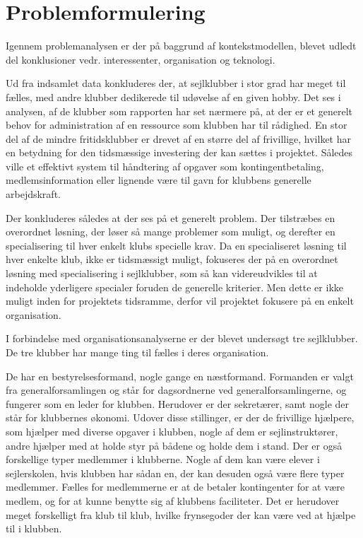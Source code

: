 \chapter{Problemformulering}\label{chap:problemformulering}


Igennem problemanalysen er der på baggrund af kontekstmodellen, blevet udledt del konklusioner vedr. interessenter, organisation og teknologi.

Ud fra indsamlet data konkluderes der, at sejlklubber i stor grad har meget til fælles, med andre klubber dedikerede til udøvelse af en given hobby. Det ses i analysen, af de klubber som rapporten har set nærmere på, at der er et generelt behov for administration af en ressource som klubben har til rådighed. En stor del af de mindre fritidsklubber er drevet af en større del af frivillige, hvilket har en betydning for den tidsmæssige investering der kan sættes i projektet. Således ville et effektivt system til håndtering af opgaver som kontingentbetaling, medlemsinformation eller lignende være til gavn for klubbens generelle arbejdskraft.

Der konkluderes således at der ses på et generelt problem. Der tilstræbes en overordnet løsning, der løser så mange problemer som muligt, og derefter en specialisering til hver enkelt klubs specielle krav. Da en specialiseret løsning til hver enkelte klub, ikke er tidsmæssigt muligt, fokuseres der på en overordnet løsning med specialisering i sejlklubber, som så kan videreudvikles til at indeholde yderligere specialer foruden de generelle kriterier. Men dette er ikke muligt inden for projektets tidsramme, derfor vil projektet fokusere på en enkelt organisation. 

I forbindelse med organisationsanalyserne er der blevet undersøgt tre sejlklubber. De tre klubber har mange ting til fælles i deres organisation.

De har en bestyrelsesformand, nogle gange en næstformand. Formanden er valgt fra generalforsamlingen og står for
dagsordnerne ved generalforsamlingerne, og fungerer som en leder for klubben. Herudover er der sekretærer, samt nogle
der står for klubbernes økonomi. Udover disse stillinger, er der de frivillige hjælpere, som hjælper med diverse opgaver
i klubben, nogle af dem er sejlinstruktører, andre hjælper med at holde styr på bådene og holde dem i stand. Der er også
forskellige typer medlemmer i klubberne. Nogle af dem kan være elever i sejlerskolen, hvis klubben har sådan en, der kan
desuden også være flere typer medlemmer. Fælles for medlemmerne er at de betaler kontingenter for at være medlem, og for
at kunne benytte sig af klubbens faciliteter. Det er herudover meget forskelligt fra klub til klub, hvilke frynsegoder
der kan være ved at hjælpe til i klubben.

